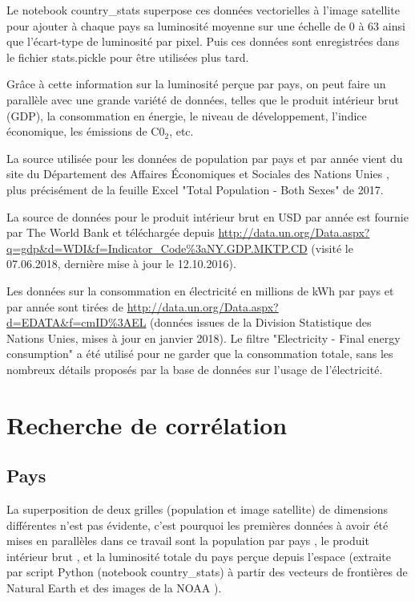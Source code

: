 \documentclass[a4paper, 11pt]{report}
\begin{document}
Le notebook country\_stats superpose ces données vectorielles à l'image satellite pour ajouter à chaque pays sa luminosité moyenne sur une échelle de 0 à 63 ainsi que l'écart-type de luminosité par pixel. Puis ces données sont enregistrées dans le fichier stats.pickle pour être utilisées plus tard.

Grâce à cette information sur la luminosité perçue par pays, on peut faire un parallèle avec une grande variété de données, telles que le produit intérieur brut (GDP), la consommation en énergie, le niveau de développement, l'indice économique, les émissions de C0$_2$, etc.

La source utilisée pour les données de population par pays et par année vient du site du Département des Affaires Économiques et Sociales des Nations Unies \cite{un-wpp}, plus précisément de la feuille Excel "Total Population - Both Sexes" de 2017.

La source de données pour le produit intérieur brut en USD par année est fournie par The World Bank \cite{theworldbank} et téléchargée depuis \url{http://data.un.org/Data.aspx?q=gdp&d=WDI&f=Indicator_Code%3aNY.GDP.MKTP.CD} (visité le 07.06.2018, dernière mise à jour le 12.10.2016).

Les données sur la consommation en électricité en millions de kWh par pays et par année sont tirées de \url{http://data.un.org/Data.aspx?d=EDATA&f=cmID%3AEL} (données issues de la Division Statistique des Nations Unies, mises à jour en janvier 2018). Le filtre "Electricity - Final energy consumption" a été utilisé pour ne garder que la consommation totale, sans les nombreux détails proposés par la base de données sur l'usage de l'électricité.

\section{Recherche de corrélation}
\subsection{Pays}
La superposition de deux grilles (population et image satellite) de dimensions différentes n'est pas évidente, c'est pourquoi les premières données à avoir été mises en parallèles dans ce travail sont la population par pays \cite{un-wpp}, le produit intérieur brut \cite{theworldbank}, et la luminosité totale du pays perçue depuis l'espace (extraite par script Python (notebook country\_stats) à partir des vecteurs de frontières de Natural Earth \cite{naturalearthdata} et des images de la NOAA \cite{noaa}).
\end{document}
